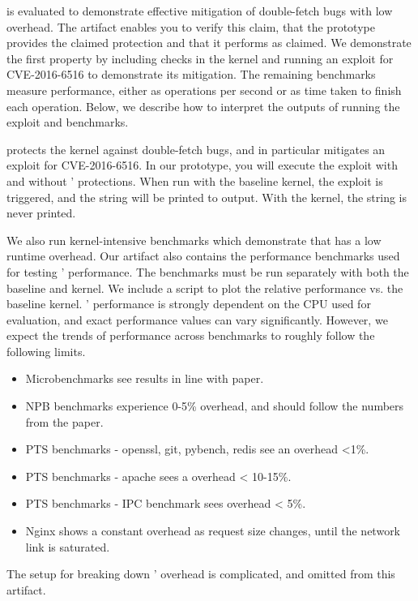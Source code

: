 \midas{} is evaluated to demonstrate effective mitigation of
double-fetch bugs with low overhead. 
The artifact enables you to verify this claim, that the 
prototype provides the claimed protection and that it 
performs as claimed.
We demonstrate the first property by including checks in the
kernel and running an exploit for CVE-2016-6516 to demonstrate 
its mitigation.
The remaining benchmarks measure performance, either as operations
per second or as time taken to finish each operation.
Below, we describe how to interpret the outputs of running the exploit
and benchmarks.

\midas{} protects the kernel against double-fetch bugs, and in 
particular mitigates an exploit for CVE-2016-6516.
In our prototype, you will execute the exploit with and without
\midas{}' protections.
When run with the baseline kernel, the exploit is triggered, and the 
string  will be printed to 
 output.
With the \midas{} kernel, the string is never printed.

We also run kernel-intensive benchmarks which demonstrate that
\midas{} has a low runtime overhead. 
Our artifact also contains the performance benchmarks used for
testing \midas{}' performance.
The benchmarks must be run separately with both the baseline and
\midas{} kernel. 
We include a script to plot the relative performance vs. the 
baseline kernel.
\midas{}' performance is strongly dependent on the CPU used for
evaluation, and exact performance values can vary significantly.
However, we expect the trends of performance across benchmarks to
roughly follow the following limits.
\begin{itemize}[nosep]
  \item Microbenchmarks see results in line with paper.
  \item NPB benchmarks experience 0-5\% overhead, and should follow the 
        numbers from the paper.
  \item PTS benchmarks - openssl, git, pybench, redis see an overhead <1\%.
  \item PTS benchmarks - apache sees a overhead < 10-15\%.
  \item PTS benchmarks - IPC benchmark sees overhead < 5\%.
  \item Nginx shows a constant overhead as request size changes, until the
        network link is saturated.
\end{itemize}

The setup for breaking down \midas{}' overhead is complicated, and omitted
from this artifact.

